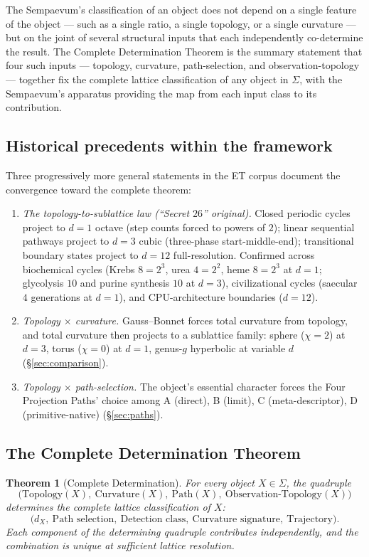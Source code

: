 \documentclass[11pt,a4paper]{article}
\newtheorem{theorem}{Theorem}[section]
\theoremstyle{definition}
\theoremstyle{remark}
\begin{document}
The Sempaevum's classification of an object does not depend on a single feature of the object --- such as a single ratio, a single topology, or a single curvature --- but on the joint of several structural inputs that each independently co-determine the result. The Complete Determination Theorem is the summary statement that four such inputs --- topology, curvature, path-selection, and observation-topology --- together fix the complete lattice classification of any object in $\Sigma$, with the Sempaevum's apparatus providing the map from each input class to its contribution.

\subsection{Historical precedents within the framework}

Three progressively more general statements in the ET corpus document the convergence toward the complete theorem:
\begin{enumerate}[leftmargin=*]
\item \emph{The topology-to-sublattice law (``Secret $26$'' original).} Closed periodic cycles project to $d=1$ octave (step counts forced to powers of $2$); linear sequential pathways project to $d=3$ cubic (three-phase start-middle-end); transitional boundary states project to $d=12$ full-resolution. Confirmed across biochemical cycles (Krebs $8=2^{3}$, urea $4=2^{2}$, heme $8=2^{3}$ at $d=1$; glycolysis $10$ and purine synthesis $10$ at $d=3$), civilizational cycles (saecular $4$ generations at $d=1$), and CPU-architecture boundaries ($d=12$).
\item \emph{Topology $\times$ curvature.} Gauss--Bonnet forces total curvature from topology, and total curvature then projects to a sublattice family: sphere ($\chi = 2$) at $d=3$, torus ($\chi = 0$) at $d=1$, genus-$g$ hyperbolic at variable $d$ (\S\ref{sec:comparison}).
\item \emph{Topology $\times$ path-selection.} The object's essential character forces the Four Projection Paths' choice among A (direct), B (limit), C (meta-descriptor), D (primitive-native) (\S\ref{sec:paths}).
\end{enumerate}

\subsection{The Complete Determination Theorem}

\begin{theorem}[Complete Determination]\label{thm:secret26}
For every object $X\in\Sigma$, the quadruple
\[
\bigl(\text{Topology}(X),\ \text{Curvature}(X),\ \text{Path}(X),\ \text{Observation-Topology}(X)\bigr)
\]
determines the complete lattice classification of $X$:
\[
\bigl(d_{X},\ \text{Path selection},\ \text{Detection class},\ \text{Curvature signature},\ \text{Trajectory}\bigr).
\]
Each component of the determining quadruple contributes independently, and the combination is unique at sufficient lattice resolution.
\end{theorem}
\end{document}
